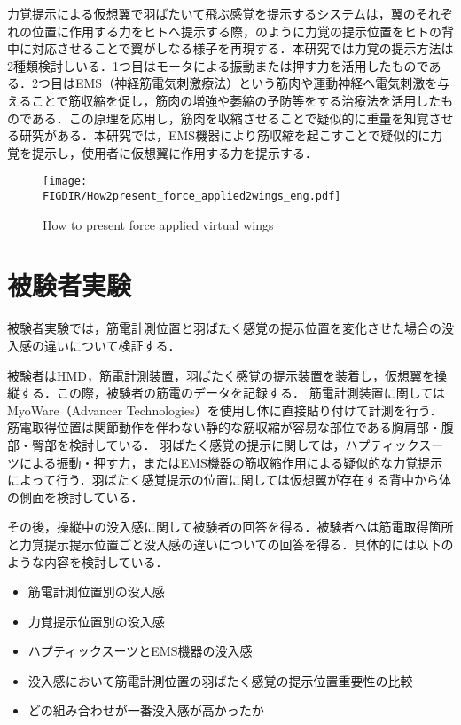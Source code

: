 \begin{small}
    力覚提示による仮想翼で羽ばたいて飛ぶ感覚を提示するシステムは，翼のそれぞれの位置に作用する力をヒトへ提示する際，のように力覚の提示位置をヒトの背中に対応させることで翼がしなる様子を再現する．本研究では力覚の提示方法は2種類検討しいる．1つ目はモータによる振動または押す力を活用したものである．2つ目はEMS（神経筋電気刺激療法）という筋肉や運動神経へ電気刺激を与えることで筋収縮を促し，筋肉の増強や萎縮の予防等をする治療法を活用したものである．この原理を応用し，筋肉を収縮させることで疑似的に重量を知覚させる研究がある\cite{小川剛史2017電気的筋肉刺激が重量知覚に及ぼす影響の分析}．本研究では，EMS機器により筋収縮を起こすことで疑似的に力覚を提示し，使用者に仮想翼に作用する力を提示する．



    \begin{figure}[t]
      \begin{center}
        \texttt{[image: \\FIGDIR/How2present\_force\_applied2wings\_eng.pdf]}%
        \caption{How to present force applied virtual wings}
      \end{center}
    \end{figure}



\section{被験者実験}
  被験者実験では，筋電計測位置と羽ばたく感覚の提示位置を変化させた場合の没入感の違いについて検証する．
    
  被験者はHMD，筋電計測装置，羽ばたく感覚の提示装置を装着し，仮想翼を操縦する．この際，被験者の筋電のデータを記録する．
  筋電計測装置に関してはMyoWare（Advancer Technologies）を使用し体に直接貼り付けて計測を行う．筋電取得位置は関節動作を伴わない静的な筋収縮が容易な部位である胸肩部・腹部・臀部を検討している．
  羽ばたく感覚の提示に関しては，ハプティックスーツによる振動・押す力，またはEMS機器の筋収縮作用による疑似的な力覚提示によって行う．羽ばたく感覚提示の位置に関しては仮想翼が存在する背中から体の側面を検討している．
  
  その後，操縦中の没入感に関して被験者の回答を得る．被験者へは筋電取得箇所と力覚提示提示位置ごと没入感の違いについての回答を得る．具体的には以下のような内容を検討している．
  \begin{itemize}
    \item 筋電計測位置別の没入感
    \item 力覚提示位置別の没入感
    \item ハプティックスーツとEMS機器の没入感
    \item 没入感において筋電計測位置の羽ばたく感覚の提示位置重要性の比較
    \item どの組み合わせが一番没入感が高かったか
  \end{itemize}
    


\end{small}
